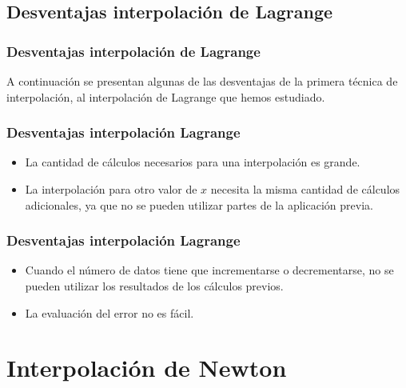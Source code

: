 \subsection{Desventajas interpolación de Lagrange}
\begin{frame}
\frametitle{Desventajas interpolación de Lagrange}
A continuación se presentan algunas de las desventajas de la primera técnica de interpolación, al interpolación de Lagrange que hemos estudiado.
\end{frame}
\begin{frame}
\frametitle{Desventajas interpolación Lagrange}
\begin{itemize}[<+->]
\item [\textcolor{red}{\xmark}] La cantidad de cálculos necesarios para una interpolación es grande.
\item [\textcolor{red}{\xmark}] La interpolación para otro valor de $x$ necesita la misma cantidad de cálculos adicionales, ya que no se pueden utilizar partes de la aplicación previa.
\end{itemize}
\end{frame}
\begin{frame}
\frametitle{Desventajas interpolación Lagrange}
\begin{itemize}[<+->]
\item [\textcolor{red}{\xmark}] Cuando el número de datos tiene que incrementarse o decrementarse, no se pueden utilizar los resultados de los cálculos previos.
\item [\textcolor{red}{\xmark}] La evaluación del error no es fácil.
\end{itemize}
\end{frame}
\section{Interpolación de Newton}
